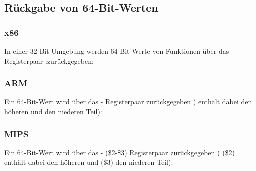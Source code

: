 \subsection{Rückgabe von 64-Bit-Werten}



\subsubsection{x86}
In einer 32-Bit-Umgebung werden 64-Bit-Werte von Funktionen über das Registerpaar \EDX:\EAX zurückgegeben:



\subsubsection{ARM}
Ein 64-Bit-Wert wird über das - Registerpaar zurückgegeben ( enthält dabei den höheren und 
den niederen Teil):



\subsubsection{MIPS}

Ein 64-Bit-Wert wird über das - (\$2-\$3) Registerpaar zurückgegeben ( (\$2) enthält dabei den
höheren und  (\$3) den niederen Teil):





